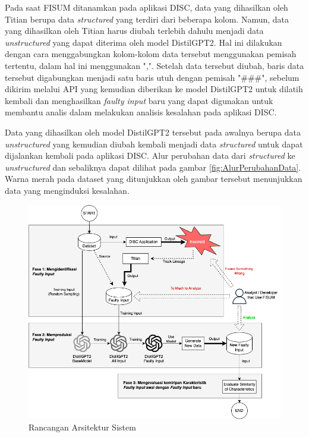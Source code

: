   


  Pada saat FISUM ditanamkan pada aplikasi DISC, 
  data yang dihasilkan oleh Titian berupa data 
  \emph{structured} yang terdiri dari beberapa kolom. 
  Namun, data yang dihasilkan oleh Titian harus
  diubah terlebih dahulu menjadi data \emph{unstructured}
  yang dapat diterima oleh model DistilGPT2.
  Hal ini dilakukan dengan cara menggabungkan
  kolom-kolom data tersebut menggunakan pemisah
  tertentu, dalam hal ini menggunakan ",".
  Setelah data tersebut diubah, baris data tersebut
  digabungkan menjadi satu baris utuh dengan pemisah "\#\#\#",
  sebelum dikirim melalui API yang
  kemudian diberikan ke model DistilGPT2 untuk
  dilatih kembali dan menghasilkan \emph{faulty input}
  baru yang dapat digunakan untuk membantu analis
  dalam melakukan analisis kesalahan pada aplikasi DISC.
  
  Data yang dihasilkan oleh model DistilGPT2 tersebut
  pada awalnya berupa data \emph{unstructured} yang
  kemudian diubah kembali menjadi data \emph{structured}
  untuk dapat dijalankan kembali pada aplikasi DISC.
  Alur perubahan data dari \emph{structured} ke \emph{unstructured}
  dan sebaliknya dapat dilihat pada gambar \ref{fig:AlurPerubahanData}.
  Warna merah pada dataset yang ditunjukkan oleh gambar
  tersebut menunjukkan data yang menginduksi kesalahan.

  \begin{figure}[H]
    \centering
    \includegraphics[scale=0.45]{gambar/ArsitekturFISUM.png}
  
    \caption{Rancangan Arsitektur Sistem}
    \label{fig:arsitektur}
  \end{figure}

